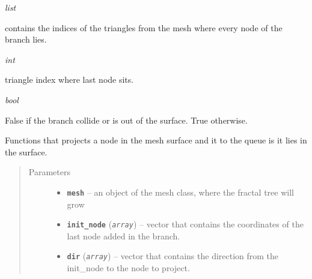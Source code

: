 \documentclass[letterpaper,10pt,english]{sphinxmanual}
\begin{document}
\begin{fulllineitems}
\begin{fulllineitems}
\label{Branch3D:Branch3D.Branch.triangles}
\emph{list}

contains the indices of the triangles from the mesh where every node of the branch lies.

\end{fulllineitems}


\begin{fulllineitems}
\label{Branch3D:Branch3D.Branch.tri}
\emph{int}

triangle index where last node sits.

\end{fulllineitems}


\begin{fulllineitems}
\label{Branch3D:Branch3D.Branch.growing}
\emph{bool}

False if the branch collide or is out of the surface. True otherwise.

\end{fulllineitems}


\begin{fulllineitems}
\label{Branch3D:Branch3D.Branch.add_node_to_queue}
Functions that projects a node in the mesh surface and it to the queue is it lies in the surface.
\begin{quote}\begin{description}
\item[{Parameters}] \leavevmode\begin{itemize}
\item {} 
\textbf{\texttt{mesh}} -- an object of the mesh class, where the fractal tree will grow

\item {} 
\textbf{\texttt{init\_node}} (\emph{\texttt{array}}) -- vector that contains the coordinates of the last node added in the branch.

\item {} 
\textbf{\texttt{dir}} (\emph{\texttt{array}}) -- vector that contains the direction from the init\_node to the node to project.


\end{itemize}
\end{description}
\end{quote}
\end{fulllineitems}
\end{fulllineitems}
\end{document}
